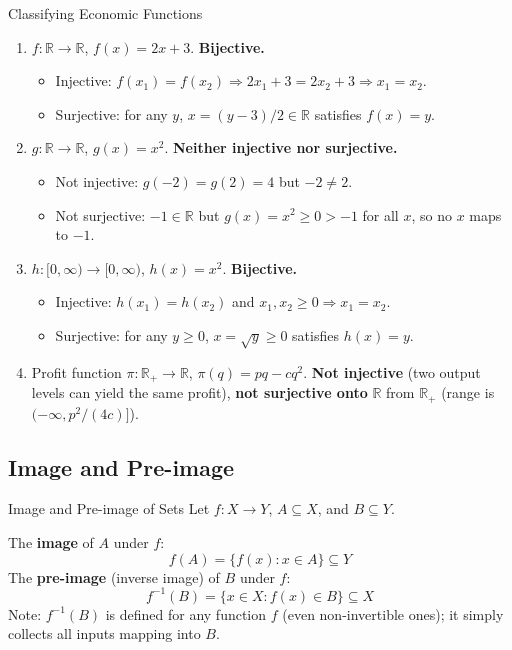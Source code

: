 \documentclass[12pt, a4paper]{article}
\theoremstyle{definition}
\newcommand{\R}{\mathbb{R}}
\begin{document}
\begin{exbox}{Classifying Economic Functions}
\begin{enumerate}
  \item $f: \R \to \R$, $f(x) = 2x + 3$. \textbf{Bijective.}
    \begin{itemize}
      \item Injective: $f(x_1)=f(x_2) \Rightarrow 2x_1+3=2x_2+3 \Rightarrow x_1=x_2$. \checkmark
      \item Surjective: for any $y$, $x=(y-3)/2\in\R$ satisfies $f(x)=y$. \checkmark
    \end{itemize}
  \item $g: \R \to \R$, $g(x) = x^2$. \textbf{Neither injective nor surjective.}
    \begin{itemize}
      \item Not injective: $g(-2)=g(2)=4$ but $-2\neq 2$.
      \item Not surjective: $-1 \in \R$ but $g(x)=x^2\geq 0>-1$ for all $x$, so no $x$ maps to $-1$.
    \end{itemize}
  \item $h: [0,\infty) \to [0,\infty)$, $h(x) = x^2$. \textbf{Bijective.}
    \begin{itemize}
      \item Injective: $h(x_1)=h(x_2)$ and $x_1,x_2\geq 0 \Rightarrow x_1=x_2$. \checkmark
      \item Surjective: for any $y\geq 0$, $x=\sqrt{y}\geq 0$ satisfies $h(x)=y$. \checkmark
    \end{itemize}
  \item Profit function $\pi: \R_+ \to \R$, $\pi(q) = pq - cq^2$. \textbf{Not injective} (two output levels can yield the same profit), \textbf{not surjective onto} $\R$ from $\R_+$ (range is $(-\infty, p^2/(4c)]$).
\end{enumerate}
\end{exbox}

\subsection{Image and Pre-image}

\begin{defbox}{Image and Pre-image of Sets}
Let $f: X \to Y$, $A \subseteq X$, and $B \subseteq Y$.

The \textbf{image} of $A$ under $f$:
\[
  f(A) = \{f(x) : x \in A\} \subseteq Y
\]
The \textbf{pre-image} (inverse image) of $B$ under $f$:
\[
  f^{-1}(B) = \{x \in X : f(x) \in B\} \subseteq X
\]
Note: $f^{-1}(B)$ is defined for any function $f$ (even non-invertible ones); it simply collects all inputs mapping into $B$.
\end{defbox}
\end{document}

